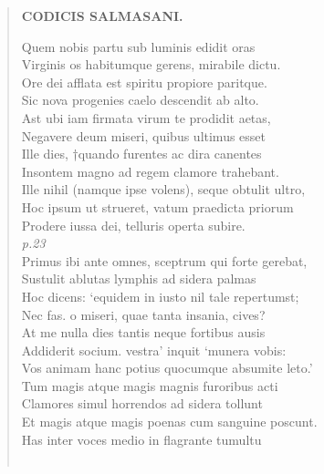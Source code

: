 \documentclass[11pt, a4paper]{report}
\begin{document}
\begin{verse}
    \begin{center} \textbf{CODICIS SALMASANI.} \end{center} \marginpar{[57]} Quem nobis partu sub luminis edidit oras \\ Virginis os habitumque gerens, mirabile dictu. \\ Ore  \lbrack dei \rbrack  afflata est spiritu propiore paritque. \\ Sic nova progenies caelo descendit ab alto. \\ Ast ubi iam firmata virum te prodidit aetas, \\ Negavere deum miseri, quibus ultimus esset \\ Ille dies, †quando furentes ac dira canentes \\ Insontem magno ad regem clamore trahebant. \\ Ille nihil (namque ipse volens), seque obtulit ultro, \\ Hoc ipsum ut strueret, vatum praedicta priorum \\ Prodere iussa dei, telluris operta subire. \\ \textit{p.23} \\ Primus ibi ante omnes, sceptrum qui forte gerebat, \\ Sustulit ablutas lymphis ad sidera palmas \\ Hoc dicens: ‘equidem in iusto nil tale repertumst; \\ Nec fas. o miseri, quae tanta insania, cives? \\  \lbrack At \rbrack  me nulla dies tantis neque fortibus ausis \\ Addiderit socium. vestra’ inquit ‘munera vobis: \\ Vos animam hanc potius quocumque absumite leto.’ \\ Tum magis atque magis magnis furoribus acti \\ Clamores simul horrendos ad sidera tollunt \\ Et magis atque magis poenas cum sanguine poscunt. \\ Has inter voces medio in flagrante tumultu \\ 
        ﻿\pagebreak 

\end{verse}
\end{document}
